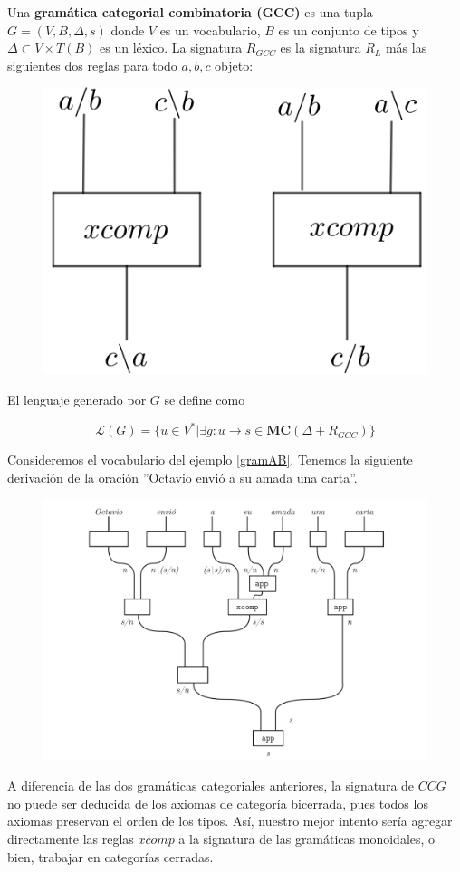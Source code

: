 \documentclass[../main.tex]{subfiles}
\begin{document}
	\begin{dfn}
		Una \textbf{gramática categorial combinatoria (GCC)} es una tupla $G=(V,B, \Delta, s)$ donde $V$ es un vocabulario, $B$ es un conjunto de tipos y $\Delta \subset V \times T(B)$ es un léxico. La signatura $R_{GCC}$ es la signatura $R_{L}$ más las siguientes dos reglas para todo $a,b,c$ objeto:
		\begin{figure}[H]
			\includegraphics[scale=18]{diagrama/CCG.png}
			\centering
		\end{figure}
		El lenguaje generado por $G$ se define como
		
		$$\mathcal{L}(G)= \{ u \in V^*|\exists g:u \to s \in \textbf{MC}(\Delta + R_{GCC}) \}$$
	\end{dfn}
	\begin{ej}
		Consideremos el vocabulario del ejemplo \ref{gramAB}. Tenemos la siguiente derivación de la oración ''Octavio envió a su amada una carta''.
        \begin{figure}[H]		\includegraphics[scale=.45]{TeX/diagrama/4-1.pdf}
			\centering
		\end{figure}
	\end{ej}
	A diferencia de las dos gramáticas categoriales anteriores, la signatura de $CCG$ no puede ser deducida de los axiomas de categoría bicerrada, pues todos los axiomas preservan el orden de los tipos. Así, nuestro mejor intento sería agregar directamente las reglas $xcomp$ a la signatura de las gramáticas monoidales, o bien, trabajar en categorías cerradas.
	
\end{document}
